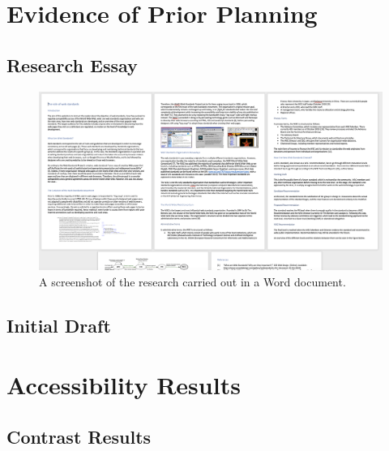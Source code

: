 \documentclass[letterpaper,12pt]{article}
\begin{document}
\begin{appendices}

\newpage



\clearpage
\section{Evidence of Prior Planning}

\subsection{Research Essay}
\label{sec:appendix-prior-planning-research-essay}

\begin{figure}[h] 
\centerline{\includegraphics[width=1.1\textwidth]{report/images/prior-planning-research.png}}
\caption{\label{fig:prior-planning-research}A screenshot of the research carried out in a Word document.}
\end{figure}

\subsection{Initial Draft}
\label{sec:appendix-prior-initial-draft}



\clearpage
\section{Accessibility Results}
\label{sec:appendix-accessibility-results}

\subsection{Contrast Results}
\label{sec:appendix-accessibility-results-contrast}


\end{appendices}
\end{document}
